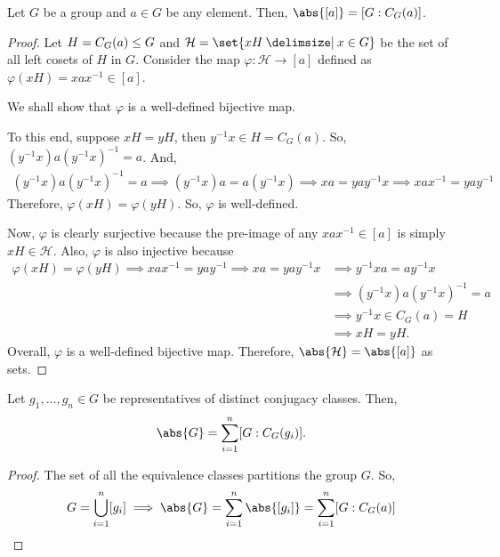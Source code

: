\documentclass[11pt]{penrose}
\begin{document}
\begin{nthm}
    Let $G$ be a group and $a \in G$ be any element. Then, $\abs{[a]} = [G : C_{G}(a)]$.
\end{nthm}
\begin{proof}
    Let $H = C_{G}(a) \mathrel{\leq} G$ and $\mathcal{H} = \set{xH \st x \in G}$ be the set of all left cosets of $H$ in $G$. Consider the map $\varphi : \mathcal{H} \to [a]$ defined as $\varphi(xH) = x a x^{-1} \in [a]$.

    We shall show that $\varphi$ is a well-defined bijective map.

    To this end, suppose $xH = yH$, then $y^{-1} x \in H = C_{G}(a)$. So, $(y^{-1} x) a (y^{-1} x)^{-1} = a$. And,
    \begin{align*}
        (y^{-1} x) a (y^{-1} x)^{-1} = a
        \implies
        (y^{-1} x) a = a (y^{-1} x)
        \implies
        xa = yay^{-1} x
        \implies
        xax^{-1} = yay^{-1}
    \end{align*}
    Therefore, $\varphi(xH) = \varphi(yH)$. So, $\varphi$ is well-defined.

    Now, $\varphi$ is clearly surjective because the pre-image of any $x a x^{-1} \in [a]$ is simply $xH \in \mathcal{H}$. Also, $\varphi$ is also injective because
    \begin{align*}
        \varphi(xH) = \varphi(yH)
        \implies
        xax^{-1} = yay^{-1}
        \implies
        xa = yay^{-1} x
        &\implies
        y^{-1} x a = a y^{-1} x\\
        &\implies
        (y^{-1} x) a (y^{-1} x)^{-1} = a\\
        &\implies
        y^{-1} x \in C_{G}(a) = H\\
        &\implies
        xH = yH.
    \end{align*}
    Overall, $\varphi$ is a well-defined bijective map. Therefore, $\abs{ \mathcal{H} } = \abs{ [a] }$ as sets.
\end{proof}

\begin{nthm}
    Let $g_{1}, \dots, g_{n} \in G$ be representatives of distinct conjugacy classes. Then,
    \begin{equation*}
        \abs{G} = \sum_{i=1}^{n} [G : C_{G}(g_{i})].
    \end{equation*}
\end{nthm}
\begin{proof}
    The set of all the equivalence classes partitions the group $G$. So,
    \begin{equation*}
        G = \bigcup_{i = 1}^{n} [g_{i}]
        \implies \abs{G} = \sum_{i = 1}^{n} \abs{[g_{i}]} = \sum_{i = 1}^{n} [G : C_{G}(a)]
        \qedhere
    \end{equation*}
\end{proof}
\end{document}
